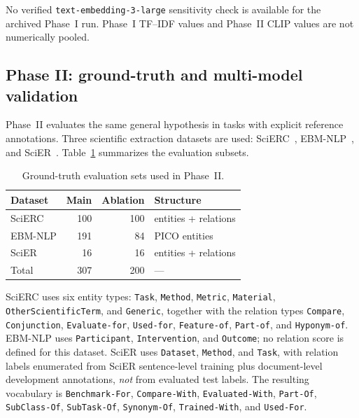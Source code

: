 \documentclass[fleqn,10pt]{wlscirep-authoryear}
\begin{document}
No verified \texttt{text-embedding-3-large} sensitivity check is
available for the archived Phase~I run. Phase~I TF--IDF values and
Phase~II CLIP values are not numerically pooled.


\subsection{Phase II: ground-truth and multi-model validation}
\label{sec:phase2}

Phase~II evaluates the same general hypothesis in tasks with explicit reference
annotations. Three scientific extraction datasets are used:
SciERC~\cite{luan2018scierc}, EBM-NLP~\cite{nye2018ebmnlp}, and
SciER~\cite{zhang2024scier}. Table~\ref{tab:benchmark-design} summarizes the
evaluation subsets.

\begin{table}[t]
\centering
\caption{Ground-truth evaluation sets used in Phase~II.}
\label{tab:benchmark-design}
\begin{tabular}{lrrl}
\toprule
Dataset & Main & Ablation & Structure \\
\midrule
SciERC  & 100 & 100 & entities + relations \\
EBM-NLP & 191 &  84 & PICO entities \\
SciER   &  16 &  16 & entities + relations \\
\midrule
Total   & 307 & 200 & --- \\
\bottomrule
\end{tabular}
\end{table}

SciERC uses six entity types:
\texttt{Task}, \texttt{Method}, \texttt{Metric}, \texttt{Material},
\texttt{OtherScientificTerm}, and \texttt{Generic}, together with the relation
types \texttt{Compare}, \texttt{Conjunction}, \texttt{Evaluate-for},
\texttt{Used-for}, \texttt{Feature-of}, \texttt{Part-of}, and
\texttt{Hyponym-of}. EBM-NLP uses \texttt{Participant},
\texttt{Intervention}, and \texttt{Outcome}; no relation score is defined for
this dataset. SciER uses \texttt{Dataset}, \texttt{Method}, and \texttt{Task},
with relation labels enumerated from SciER sentence-level training plus
document-level development annotations, \emph{not} from evaluated test labels.
The resulting vocabulary is \texttt{Benchmark-For}, \texttt{Compare-With},
\texttt{Evaluated-With}, \texttt{Part-Of}, \texttt{SubClass-Of},
\texttt{SubTask-Of}, \texttt{Synonym-Of}, \texttt{Trained-With}, and
\texttt{Used-For}.
\end{document}
